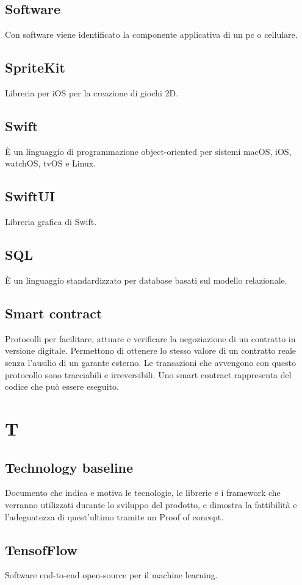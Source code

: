 \subsection{Software} Con software viene identificato la componente applicativa di un pc o cellulare.
\subsection{SpriteKit} Libreria per iOS per la creazione di giochi 2D.
\subsection{Swift} È un linguaggio di programmazione object-oriented per sistemi macOS, iOS, watchOS, tvOS e Linux.
\subsection{SwiftUI} Libreria grafica di Swift.
\subsection{SQL} È un linguaggio standardizzato per database basati sul modello relazionale.
\subsection{Smart contract} Protocolli per facilitare, attuare e verificare la negoziazione di un contratto in versione digitale.
Permettono di ottenere lo stesso valore di un contratto reale senza l'ausilio di un garante esterno. Le transazioni che avvengono con questo protocollo sono tracciabili e irreversibili. Uno smart contract rappresenta del codice che può essere eseguito.
\newpage \section{T}
\subsection{Technology baseline} Documento che indica e motiva le tecnologie, le librerie e
i framework che verranno utilizzati durante lo sviluppo del prodotto, e dimostra la fattibilità e l'adeguatezza di quest'ultimo tramite un Proof of concept.
\subsection{TensofFlow} Software end-to-end open-source per il machine learning.
